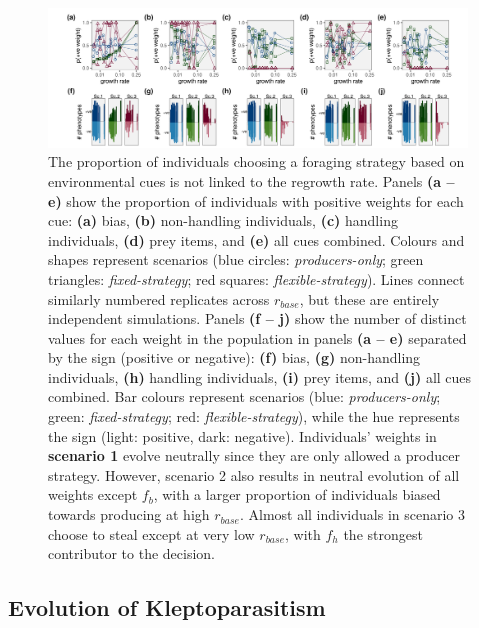 \documentclass[11pt]{article}
\begin{document}
\begin{figure}[h]
    \centering
    \includegraphics[width=0.99\textwidth]{figures/fig_04_strategy_weight_end_vals.png}
    \caption{
        The proportion of individuals choosing a foraging strategy based on environmental cues is not linked to the regrowth rate.
        Panels \textbf{(a -- e)} show the proportion of individuals with positive weights for each cue: \textbf{(a)} bias, \textbf{(b)} non-handling individuals, \textbf{(c)} handling individuals, \textbf{(d)} prey items, and \textbf{(e)} all cues combined.
        Colours and shapes represent scenarios (blue circles: \textit{producers-only}; green triangles: \textit{fixed-strategy}; red squares: \textit{flexible-strategy}).
        Lines connect similarly numbered replicates across $r_{base}$, but these are entirely independent simulations.
        Panels \textbf{(f -- j)} show the number of distinct values for each weight in the population in panels \textbf{(a -- e)} separated by the sign (positive or negative): \textbf{(f)} bias, \textbf{(g)} non-handling individuals, \textbf{(h)} handling individuals, \textbf{(i)} prey items, and \textbf{(j)} all cues combined.
        Bar colours represent scenarios (blue: \textit{producers-only}; green: \textit{fixed-strategy}; red: \textit{flexible-strategy}), while the hue represents the sign (light: positive, dark: negative).
        Individuals' weights in \textbf{scenario 1} evolve neutrally since they are only allowed a producer strategy.
        However, scenario 2 also results in neutral evolution of all weights except $f_b$, with a larger proportion of individuals biased towards producing at high $r_{base}$.
        Almost all individuals in scenario 3 choose to steal except at very low $r_{base}$, with $f_h$ the strongest contributor to the decision.
    }
    \label{fig:figure_pipeline}
\end{figure}

\subsection*{Evolution of Kleptoparasitism}
\end{document}
